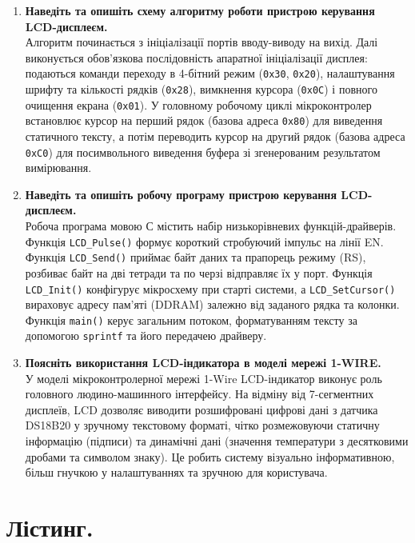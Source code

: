 \documentclass[14pt, a4paper]{extreport}
\begin{document}
\begin{enumerate}
		\item \textbf{Наведіть та опишіть схему алгоритму роботи пристрою керування LCD-дисплеєм.} \\ Алгоритм починається з ініціалізації портів вводу-виводу на вихід. Далі виконується обов'язкова послідовність апаратної ініціалізації дисплея: подаються команди переходу в 4-бітний режим (\texttt{0x30}, \texttt{0x20}), налаштування шрифту та кількості рядків (\texttt{0x28}), вимкнення курсора (\texttt{0x0C}) і повного очищення екрана (\texttt{0x01}). У головному робочому циклі мікроконтролер встановлює курсор на перший рядок (базова адреса \texttt{0x80}) для виведення статичного тексту, а потім переводить курсор на другий рядок (базова адреса \texttt{0xC0}) для посимвольного виведення буфера зі згенерованим результатом вимірювання.
		
		\item \textbf{Наведіть та опишіть робочу програму пристрою керування LCD-дисплеєм.} \\ Робоча програма мовою С містить набір низькорівневих функцій-драйверів. Функція \texttt{LCD\_Pulse()} формує короткий стробуючий імпульс на лінії EN. Функція \texttt{LCD\_Send()} приймає байт даних та прапорець режиму (RS), розбиває байт на дві тетради та по черзі відправляє їх у порт. Функція \texttt{LCD\_Init()} конфігурує мікросхему при старті системи, а \texttt{LCD\_SetCursor()} вираховує адресу пам'яті (DDRAM) залежно від заданого рядка та колонки. Функція \texttt{main()} керує загальним потоком, форматуванням тексту за допомогою \texttt{sprintf} та його передачею драйверу.
		
		\item \textbf{Поясніть використання LCD-індикатора в моделі мережі 1-WIRE.} \\ У моделі мікроконтролерної мережі 1-Wire LCD-індикатор виконує роль головного людино-машинного інтерфейсу. На відміну від 7-сегментних дисплеїв, LCD дозволяє виводити розшифровані цифрові дані з датчика DS18B20 у зручному текстовому форматі, чітко розмежовуючи статичну інформацію (підписи) та динамічні дані (значення температури з десятковими дробами та символом знаку). Це робить систему візуально інформативною, більш гнучкою у налаштуваннях та зручною для користувача.
	\end{enumerate}
	
	\pagebreak
	
	\section*{Лістинг.}
	
\end{document}
